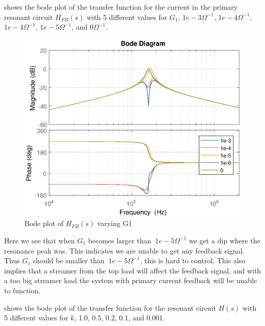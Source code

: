  shows the bode plot of the transfer function for the current in the primary resonant circuit $H_{FB}(s)$ with 5 different values for $G_1$, $1e-3{\Omega}^{-1}$, $1e-4{\Omega}^{-1}$, $1e-4{\Omega}^{-1}$, $1e-5{\Omega}^{-1}$, and $0{\Omega}^{-1}$.
\begin{figure}[H]
    \centering
    \includegraphics[width=\textwidth]{img/FeedBackBode_G1.eps}
    \caption{Bode plot of $H_{FB}(s)$ varying G1}
    \label{fig:fbbode_g1}
\end{figure}

Here we see that when $G_1$ becomes larger than $~1e-5{\Omega}^{-1}$ we get a dip where the resonance peak was. This indicates we are unable to get any feedback signal. Thus $G_1$ should be smaller than $~1e-5{\Omega}^{-1}$, this is hard to control. This also implies that a streamer from the top load will affect the feedback signal, and with a too big streamer load the system with primary current feedback will be unable to function.

\newpage
{} shows the bode plot of the transfer function for the resonant circuit $H(s)$ with 5 different values for $k$, 1.0, 0.5, 0.2, 0.1, and 0.001.

